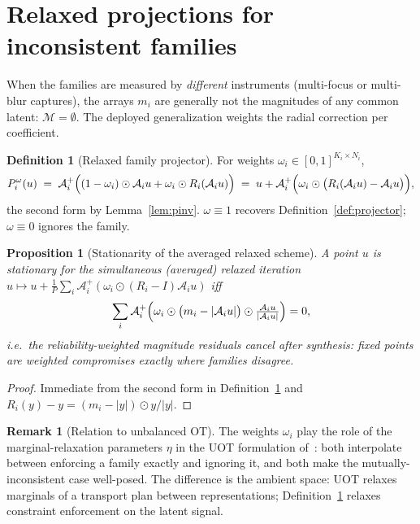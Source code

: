 \documentclass[11pt]{article}
\newtheorem{proposition}[theorem]{Proposition}
\theoremstyle{definition}
\newtheorem{definition}[theorem]{Definition}
\newtheorem{remark}[theorem]{Remark}
\newcommand{\cA}{\mathcal{A}}
\newcommand{\cM}{\mathcal{M}}
\newcommand{\abs}[1]{\lvert #1\rvert}
\begin{document}
\section{Relaxed projections for inconsistent families}\label{sec:relaxed}

When the families are measured by \emph{different} instruments
(multi-focus or multi-blur captures), the arrays $m_i$ are generally not
the magnitudes of any common latent: $\cM=\emptyset$.  The deployed
generalization weights the radial correction per coefficient.

\begin{definition}[Relaxed family projector]\label{def:relaxed}
For weights $\omega_i\in[0,1]^{K_i\times N_i}$,
\[
  P_{i}^{\omega}(u)
  \;=\;\cA_{i}^{+}\Bigl((1-\omega_{i})\odot\cA_{i}u
        +\omega_{i}\odot R_{i}(\cA_{i}u)\Bigr)
  \;=\;u+\cA_{i}^{+}\Bigl(\omega_{i}\odot
        \bigl(R_{i}(\cA_{i}u)-\cA_{i}u\bigr)\Bigr),
\]
the second form by Lemma~\ref{lem:pinv}.  $\omega\equiv1$ recovers
Definition~\ref{def:projector}; $\omega\equiv0$ ignores the family.
\end{definition}

\begin{proposition}[Stationarity of the averaged relaxed scheme]
A point $u$ is stationary for the simultaneous (averaged) relaxed
iteration $u\mapsto u+\tfrac1P\sum_{i}\cA_{i}^{+}(\omega_{i}\odot
(R_{i}-I)\cA_{i}u)$ iff
\[
  \sum_{i}\cA_{i}^{+}\Bigl(\omega_{i}\odot
   \bigl(m_{i}-\abs{\cA_{i}u}\bigr)\odot
   \tfrac{\cA_{i}u}{\abs{\cA_{i}u}}\Bigr)=0 ,
\]
i.e.\ the reliability-weighted magnitude residuals cancel after synthesis:
fixed points are weighted compromises exactly where families disagree.
\end{proposition}

\begin{proof}
Immediate from the second form in Definition~\ref{def:relaxed} and
$R_i(y)-y=(m_i-\abs{y})\odot y/\abs{y}$.
\end{proof}

\begin{remark}[Relation to unbalanced OT]
The weights $\omega_i$ play the role of the marginal-relaxation parameters
$\eta$ in the UOT formulation of~\cite{valdivia2026}: both interpolate
between enforcing a family exactly and ignoring it, and both make the
mutually-inconsistent case well-posed.  The difference is the ambient
space: UOT relaxes marginals of a transport plan between representations;
Definition~\ref{def:relaxed} relaxes constraint enforcement on the latent
signal.
\end{remark}
\end{document}
